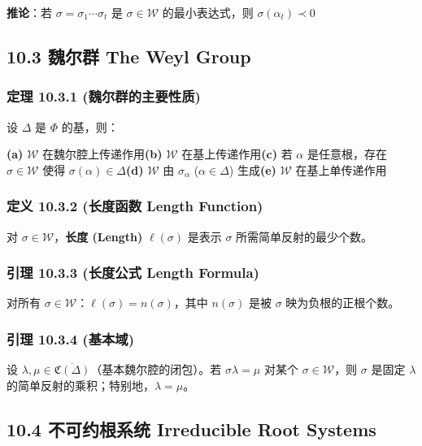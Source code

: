 \textbf{推论}：若 $\sigma = \sigma_1 \cdots \sigma_t$ 是 $\sigma \in \mathcal{W}$ 的最小表达式，则 $\sigma(\alpha_t) \prec 0$

\subsection{10.3 魏尔群 The Weyl Group}

\subsubsection{定理 10.3.1 (魏尔群的主要性质)}

设 $\Delta$ 是 $\Phi$ 的基，则：

\textbf{(a)} $\mathcal{W}$ 在魏尔腔上传递作用\textbf{(b)} $\mathcal{W}$ 在基上传递作用\textbf{(c)} 若 $\alpha$ 是任意根，存在 $\sigma \in \mathcal{W}$ 使得 $\sigma(\alpha) \in \Delta$\textbf{(d)} $\mathcal{W}$ 由 $\sigma_\alpha$ ($\alpha \in \Delta$) 生成\textbf{(e)} $\mathcal{W}$ 在基上单传递作用

\subsubsection{定义 10.3.2 (长度函数 Length Function)}

对 $\sigma \in \mathcal{W}$，\textbf{长度 (Length)} $\ell(\sigma)$ 是表示 $\sigma$ 所需简单反射的最少个数。

\subsubsection{引理 10.3.3 (长度公式 Length Formula)}

对所有 $\sigma \in \mathcal{W}$：$\ell(\sigma) = n(\sigma)$，其中 $n(\sigma)$ 是被 $\sigma$ 映为负根的正根个数。

\subsubsection{引理 10.3.4 (基本域)}

设 $\lambda, \mu \in \overline{\mathfrak{C}(\Delta)}$（基本魏尔腔的闭包）。若 $\sigma \lambda = \mu$ 对某个 $\sigma \in \mathcal{W}$，则 $\sigma$ 是固定 $\lambda$ 的简单反射的乘积；特别地，$\lambda = \mu$。

\subsection{10.4 不可约根系统 Irreducible Root Systems}


